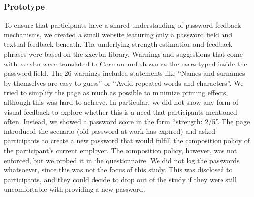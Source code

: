 
\subsubsection{Prototype}
To ensure that participants have a shared understanding of password feedback mechanisms, we created a small website featuring only a password field and textual feedback beneath. The underlying strength estimation and feedback phrases were based on the zxcvbn library. Warnings and suggestions that come with zxcvbn were translated to German and shown as the users typed inside the password field. The 26 warnings included statements like ``Names and surnames by themselves are easy to guess'' or ``Avoid repeated words and characters''. We tried to simplify the page as much as possible to minimize priming effects, although this was hard to achieve. In particular, we did not show any form of visual feedback to explore whether this is a need that participants mentioned often. Instead, we showed a password score in the form ``strength: 2/5''.  The page introduced the scenario (old password at work has expired) and asked participants to create a new password that would fulfill the composition policy of the participant's current employer. The composition policy, however, was not enforced, but we probed it in the questionnaire. We did not log the passwords whatsoever, since this was not the focus of this study. This was disclosed to participants, and they could decide to drop out of the study if they were still uncomfortable with providing a new password.  

